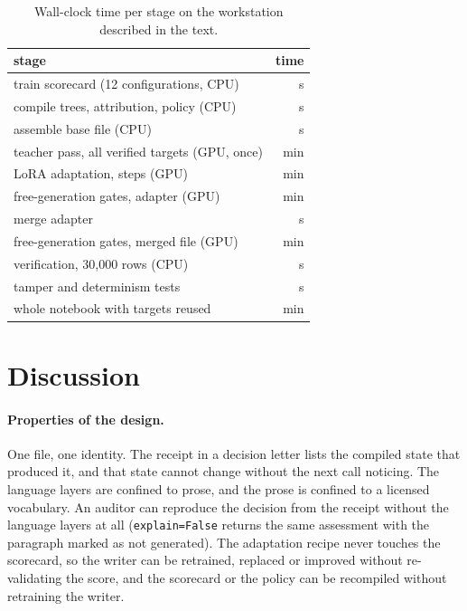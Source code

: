 \documentclass[twocolumn,10pt]{article}
\begin{document}
\begin{table}[t]
\centering\footnotesize
\caption{Wall-clock time per stage on the workstation described in the text.}
\label{tab:time}
\begin{tabular}{@{}lr@{}}
\toprule
stage & time \\
\midrule
train scorecard (12 configurations, CPU) & \nTimeScorerS{} s \\
compile trees, attribution, policy (CPU) & \nTimeCompileS{} s \\
assemble base file (CPU) & \nTimeBaseS{} s \\
teacher pass, all verified targets (GPU, once) & \nTimeTeacherMin{} min \\
LoRA adaptation, \nLoraSteps{} steps (GPU) & \nTimeLoraMin{} min \\
free-generation gates, adapter (GPU) & \nTimeAdapterGatesMin{} min \\
merge adapter & \nTimeMergeS{} s \\
free-generation gates, merged file (GPU) & \nTimeMergedGatesMin{} min \\
verification, 30,000 rows (CPU) & \nTimeVerifyS{} s \\
tamper and determinism tests & \nTimeTamperS{} s \\
\midrule
whole notebook with targets reused & \nTimeNotebookMin{} min \\
\bottomrule
\end{tabular}
\end{table}

\section{Discussion}
\label{sec:discussion}

\paragraph{Properties of the design.} One file, one identity. The receipt in a decision letter lists the compiled state that
produced it, and that state cannot change without the next call noticing. The language layers are confined to prose, and
the prose is confined to a licensed vocabulary. An auditor can reproduce the decision from the receipt without the language
layers at all (\texttt{explain=False} returns the same assessment with the paragraph marked as not generated). The
adaptation recipe never touches the scorecard, so the writer can be retrained, replaced or improved without re-validating
the score, and the scorecard or the policy can be recompiled without retraining the writer.
\end{document}

